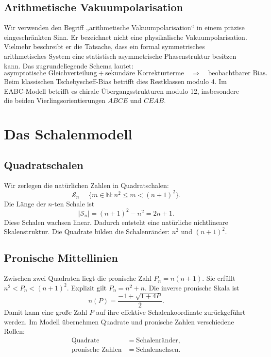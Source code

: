 \documentclass[11pt,a4paper,bibliography=totoc]{scrartcl}
\begin{document}
	\subsection{Arithmetische Vakuumpolarisation}
	Wir verwenden den Begriff „arithmetische Vakuumpolarisation“ in einem präzise eingeschränkten Sinn. Er bezeichnet nicht eine physikalische Vakuumpolarisation. Vielmehr beschreibt er die Tatsache, dass ein formal symmetrisches arithmetisches System eine statistisch asymmetrische Phasenstruktur besitzen kann. Das zugrundeliegende Schema lautet:
	\[
	\text{asymptotische Gleichverteilung} + \text{sekundäre Korrekturterme} \quad \Rightarrow \quad \text{beobachtbarer Bias}.
	\]
	Beim klassischen Tschebyscheff-Bias betrifft dies Restklassen modulo 4. Im EABC-Modell betrifft es chirale Übergangsstrukturen modulo 12, insbesondere die beiden Vierlingsorientierungen $ABCE$ und $CEAB$.
	
	\section{Das Schalenmodell}
	
	\subsection{Quadratschalen}
	Wir zerlegen die natürlichen Zahlen in Quadratschalen:
	\[
	\mathcal{S}_n = \{m \in \mathbb{N} : n^2 \leq m < (n+1)^2\}.
	\]
	Die Länge der $n$-ten Schale ist
	\[
	|\mathcal{S}_n| = (n+1)^2 - n^2 = 2n + 1.
	\]
	Diese Schalen wachsen linear. Dadurch entsteht eine natürliche nichtlineare Skalenstruktur. Die Quadrate bilden die Schalenränder: $n^2$ und $(n+1)^2$.
	
	\subsection{Pronische Mittellinien}
	Zwischen zwei Quadraten liegt die pronische Zahl $P_n = n(n+1)$. Sie erfüllt $n^2 < P_n < (n+1)^2$. Explizit gilt $P_n = n^2 + n$. Die inverse pronische Skala ist
	\[
	n(P) = \frac{-1 + \sqrt{1 + 4P}}{2}.
	\]
	Damit kann eine große Zahl $P$ auf ihre effektive Schalenkoordinate zurückgeführt werden. Im Modell übernehmen Quadrate und pronische Zahlen verschiedene Rollen:
	\begin{align}
		\text{Quadrate} &= \text{Schalenränder}, \\
		\text{pronische Zahlen} &= \text{Schalenachsen}.
	\end{align}
	
\end{document}
